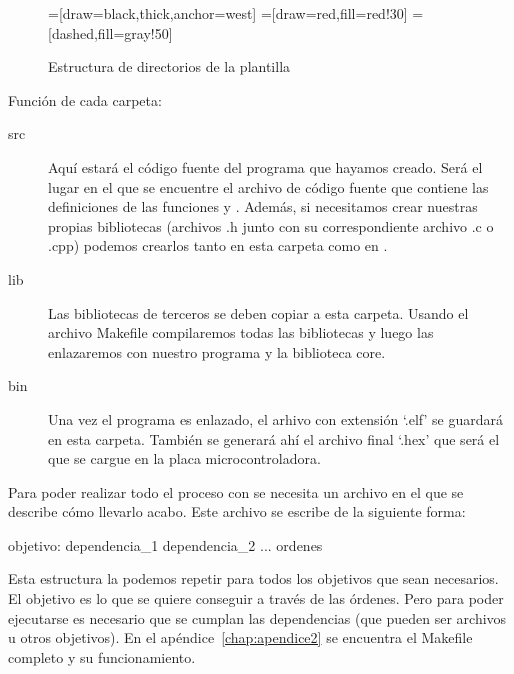 \begin{figure}[H]
\begin{center}
=[draw=black,thick,anchor=west]
=[draw=red,fill=red!30]
=[dashed,fill=gray!50]
\end{center}
\caption{Estructura de directorios de la plantilla}
\label{plantilla_carpetas}
\end{figure}

Función de cada carpeta:
\begin{description}
	\item[src] Aquí estará el código fuente del programa que hayamos creado. Será el lugar en el que se encuentre el archivo de código fuente  que contiene las definiciones de las funciones  y . Además, si necesitamos crear nuestras propias bibliotecas (archivos .h junto con su correspondiente archivo .c o .cpp) podemos crearlos tanto en esta carpeta como en .
	\item[lib] Las bibliotecas de terceros se deben copiar a esta carpeta. Usando el archivo Makefile compilaremos todas las bibliotecas y luego las enlazaremos con nuestro programa y la biblioteca core.
	\item[bin] Una vez el programa es enlazado, el arhivo con extensión `.elf' se guardará en esta carpeta. También se generará ahí el archivo final `.hex' que será el que se cargue en la placa microcontroladora.
\end{description}

Para poder realizar todo el proceso con  se necesita un archivo  en el que se describe cómo llevarlo acabo. Este archivo se escribe de la siguiente forma:
\begin{listing}[language=make]
objetivo: dependencia_1 dependencia_2 ...
	ordenes
\end{listing}
Esta estructura la podemos repetir para todos los objetivos que sean necesarios. El objetivo es lo que se quiere conseguir a través de las órdenes. Pero para poder ejecutarse es necesario que se cumplan las dependencias (que pueden ser archivos u otros objetivos). En el apéndice~\ref{chap:apendice2} se encuentra el Makefile completo y su funcionamiento.

